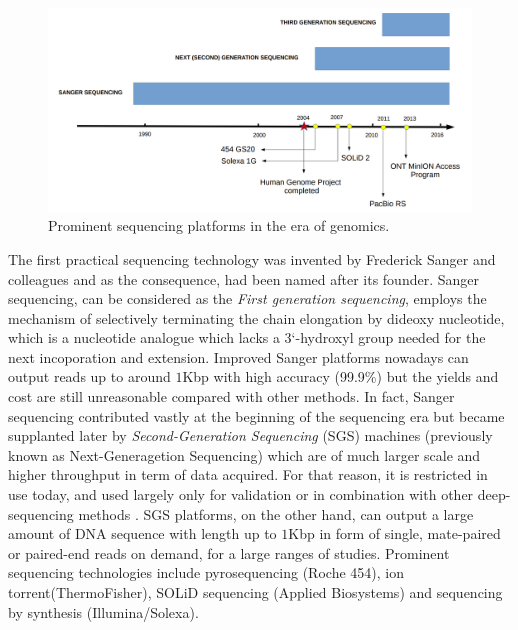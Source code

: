 \begin{figure}[ht!]
\centering
\includegraphics[width=.9\textwidth]{images/timeline.png}
\caption{Prominent sequencing platforms in the era of genomics.}
\label{Fig:nanopore}
\end{figure}
The first practical sequencing technology was invented by Frederick Sanger and colleagues \cite{Sanger1977} and as the consequence, had been named after its founder. 
Sanger sequencing, can be considered as the \emph{First generation sequencing}, employs the mechanism of selectively terminating the chain elongation by dideoxy nucleotide, which is a nucleotide analogue which lacks a 3`-hydroxyl group needed for the next incoporation and extension.
Improved Sanger platforms nowadays can output reads up to around $1$Kbp with high accuracy (99.9\%) but the yields and cost are still unreasonable compared with other methods.
In fact, Sanger sequencing contributed vastly at the beginning of the sequencing era but became supplanted later by \emph{Second-Generation Sequencing} (SGS) machines (previously known as Next-Generagetion Sequencing) which are of much larger scale and higher throughput in term of data acquired. For that reason, it is restricted in use today, and used largely only for validation or in combination with other deep-sequencing methods \cite{Freeman2009}.
SGS platforms, on the other hand, can output a large amount of DNA sequence with length up to $1$Kbp in form of single, mate-paired or paired-end reads on demand, for a large ranges of studies.
Prominent sequencing technologies include pyrosequencing \cite{Ronaghi1996,Ronaghi1998} 
(Roche 454), ion torrent(ThermoFisher), SOLiD sequencing (Applied Biosystems) and sequencing by synthesis (Illumina/Solexa).

